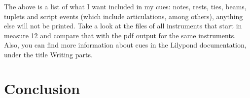 \documentclass[../../LilyPond-Tutorials]{subfiles}
\begin{document}

The above is a list of what I want included in my cues: notes, rests, ties, beams, tuplets and script events (which include articulations, among others), anything else will not be printed.
Take a look at the files of all instruments that start in measure 12 and compare that with the pdf output for the same instruments.
Also, you can find more information about cues in the Lilypond documentation, under the title Writing parts.

\section{Conclusion}

\end{document}
